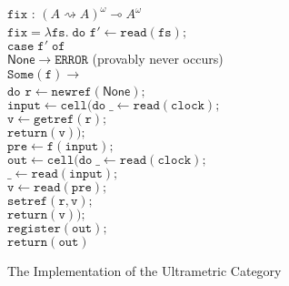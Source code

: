 \documentclass[nocopyrightspace,preprint]{sigplanconf}
\newcommand{\term}[1]{\ensuremath{\mathtt{{#1}}}}
\newcommand{\shrink}{\rightsquigarrow}
\newcommand{\lolli}{\multimap}
\newcommand{\None}{\mathsf{None}}
\begin{document}
\begin{figure}
{\begin{tabbing}
\term{fix} : $(A \shrink A)^\omega \lolli A^\omega$ \\
\term{fix = \lambda fs.\;do}
  \=\term{f' \leftarrow read(fs);} \\
  \>\term{case\;f'\;of}\\
  \>\;\;\=\term{\None \to ERROR} (provably never occurs)\\
  \>    \>\term{Some(f) \to} \\
  \>    \>\;\;\term{do} \=\term{r \leftarrow newref(\None);}\\
  \>    \>  \>\term{input \leftarrow cell(do\;}\=\term{\_ \leftarrow read(clock);}\\
  \>    \>  \>                                 \>\term{v \leftarrow getref(r);}\\
  \>    \>  \>                                 \>\term{return(v));}\\
  \>    \>  \>\term{pre \leftarrow f(input);}\\
  \>    \>  \>\term{out \leftarrow cell(do\;}\=\term{\_ \leftarrow read(clock);} \\
  \>    \>  \>                               \>\term{\_ \leftarrow read(input);} \\
  \>    \>  \>                               \>\term{v \leftarrow read(pre);}\\
  \>    \>  \>                               \>\term{setref(r, v);}\\
  \>    \>  \>                               \>\term{return(v));}\\
  \>    \>  \>\term{register(out);}\\
  \>    \>  \>\term{return(out)}
\end{tabbing}
}
\caption{The Implementation of the Ultrametric Category}
\label{ultrametric-implementation}
\end{figure}
\end{document}
